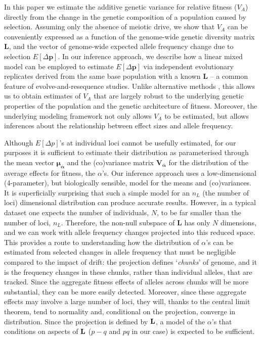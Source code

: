 \documentclass[12pt]{article}
\begin{document}
\begin{bibunit}
In this paper we estimate the additive genetic variance for relative fitness ($V_A$) directly from the change in the genetic composition of a population caused by selection. Assuming only the absence of meiotic drive, we show that $V_A$ can be conveniently expressed as a function of the genome-wide genetic diversity matrix $\textbf{L}$, and the vector of genome-wide expected allele frequency change due to selection $E[\Delta{\textbf{p}}]$. In our inference approach, we describe how a linear mixed model can be employed to estimate $E[\Delta{\textbf{p}}]$ via independent evolutionary replicates derived from the same base population with a known $\textbf{L}$ -- a common feature of evolve-and-resequence studies.  Unlike alternative methods \citep{buffalo2019linked}, this allows us to obtain estimates of $V_A$ that are largely robust to the underlying genetic properties of the population and the genetic architecture of fitness. Moreover, the underlying modeling framework not only allows $V_A$ to be estimated, but allows inferences about the relationship between effect sizes and allele frequency.    

Although $E[\Delta{p}]$'s at individual loci cannot be usefully estimated, for our purposes it is sufficient to estimate their distribution as parameterised through the mean vector $\boldsymbol{\mu_{\bar{\alpha}}}$ and the (co)variance matrix $\boldsymbol{V_{\bar{\alpha}}}$ for the distribution of the average effects for fitness, the $\alpha$'s. Our inference approach uses a low-dimensional (4-parameter), but biologically sensible, model for the means and (co)variances. It is superficially surprising that such a simple model for an $n_L$ (the number of loci) dimensional distribution can produce accurate results. However, in a typical dataset one expects the number of individuals, $N$, to be far smaller than the number of loci, $n_L$. Therefore, the non-null subspace of $\textbf{L}$ has only $N$ dimensions, and we can work with allele frequency changes projected into this reduced space. This provides a route to understanding how the distribution of $\alpha$'s can be estimated from selected changes in allele frequency that must be negligible compared to the impact of drift: the projection defines `\emph{chunks}' of genome, and it is the frequency changes in these chunks, rather than individual alleles, that are tracked. Since the aggregate fitness effects of alleles across chunks will be more substantial, they can be more easily detected. Moreover, since these aggregate effects may involve a large number of loci, they will, thanks to the central limit theorem, tend to normality and, conditional on the projection, converge in distribution. Since the projection is defined by ${\bf L}$, a model of the $\alpha$'s that conditions on aspects of ${\bf L}$ ($p-q$ and $pq$ in our case) is expected to be sufficient.      


\end{bibunit}
\end{document}
